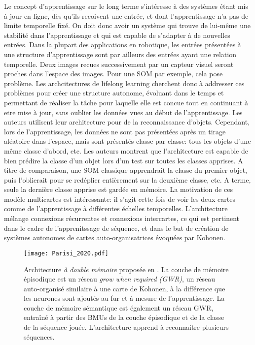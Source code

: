 \documentclass[../main]{subfiles}
\begin{document}
Le concept d'apprentissage sur le long terme s'intéresse à des systèmes étant mis à jour en ligne, dès qu'ils recoivent une entrée, et dont l'apprentissage n'a pas de limite temporelle fixé. On doit donc avoir un système qui trouve de lui-même une stabilité dans l'apprentissage et qui est capable de s'adapter à de nouvelles entrées.
Dans la plupart des applications en robotique, les entrées présentées à une structure d'apprentissage sont par ailleurs des entrées ayant une relation temporelle. Deux images recues successivement par un capteur visuel seront proches dans l'espace des images. Pour une SOM par exemple, cela pose problème. Les archcitectures de lifelong learning cherchent donc à addresser ces problèmes pour créer une structure autonome, évoluant dans le temps et permettant de réaliser la tâche pour laquelle elle est concue tout en continuant à etre mise à jour, sans oublier les données vues au début de l'apprentissage.
Les auteurs utilisent leur architecture pour de la reconnaissance d'objets. Cependant, lors de l'apprentissage, les données ne sont pas présentées après un tirage aléatoire dans l'espace, mais sont présentés classe par classe: tous les objets d'une même classe d'abord, etc. Les auteurs montrent que l'architecture est capable de bien prédire la classe d'un objet lors d'un test sur toutes les classes apprises. A titre de comparaison, une SOM classique apprendrait la classe du premier objet, puis l'oblierait pour se redéplier entièrement sur la deuxième classe, etc. A terme, seule la dernière classe apprise est gardée en mémoire.
La motivation de ces modèle multicartes est intéressante: il s'agit cette fois de voir les deux cartes comme de l'apprentissage à différentes échelles temporelles. L'architecture mélange connexions récurrentes et connexions intercartes, ce qui est pertinent dans le cadre de l'apprenitssage de séquence, et dans le but de création de systèmes autonomes de cartes auto-organisatrices évoquées par Kohonen.


\begin{figure}
    \centering
    \texttt{[image: Parisi\_2020.pdf]}
    \caption{Architecture \emph{à double mémoire} proposée en \cite{parisiLL}. La couche de mémoire épisodique est un réseau \emph{grow when required (GWR)}, un réseau auto-organisé similaire à une carte de Kohonen, à la différence que les neurones sont ajoutés au fur et à mesure de l'apprentissage. La couche de mémoire sémantique est également un réseau GWR, entraîné à partir des BMUs de la couche épisodique et de la classe de la séquence jouée. L'architecture apprend à reconnaitre plusieurs séquences.\label{fig:gdm_parisi}}
\end{figure}
\end{document}
